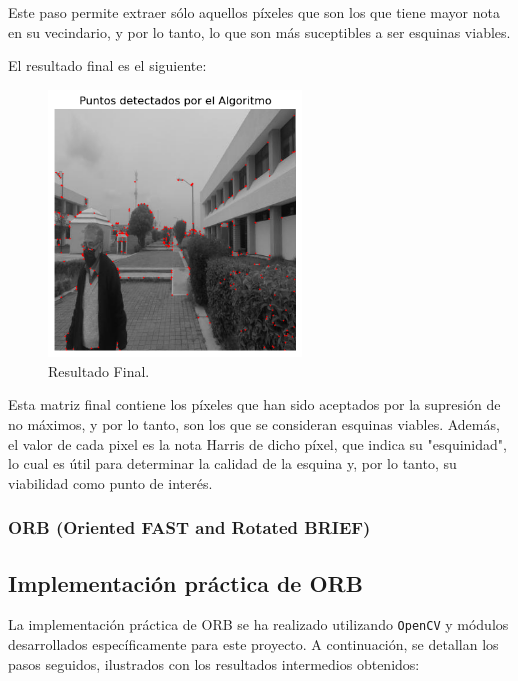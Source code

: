 \documentclass[a4paper]{article}
\begin{document}
Este paso permite extraer sólo aquellos píxeles que son los que tiene mayor nota en su vecindario, y por lo tanto, lo que son más suceptibles a ser esquinas viables.

El resultado final es el siguiente:
\par\vspace{0.5cm}

\begin{figure}[H]
    \centering
    \includegraphics[width=0.6\textwidth]{images/harris_paso_8.png}
    \caption{Resultado Final.}
\end{figure}

Esta matriz final contiene los píxeles que han sido aceptados por la supresión de no máximos, y por lo tanto, son los que se consideran esquinas viables. Además, el valor de cada pixel es la nota Harris de dicho píxel, que indica su "esquinidad", lo
cual es útil para determinar la calidad de la esquina y, por lo tanto, su viabilidad como punto de interés.

\subsubsection{ORB (Oriented FAST and Rotated BRIEF)}

\subsection*{Implementación práctica de ORB}

\par\vspace{0.5cm}
La implementación práctica de ORB se ha realizado utilizando \texttt{OpenCV} y módulos desarrollados específicamente para este proyecto. A continuación, se detallan los pasos seguidos, ilustrados con los resultados intermedios obtenidos:
\end{document}
